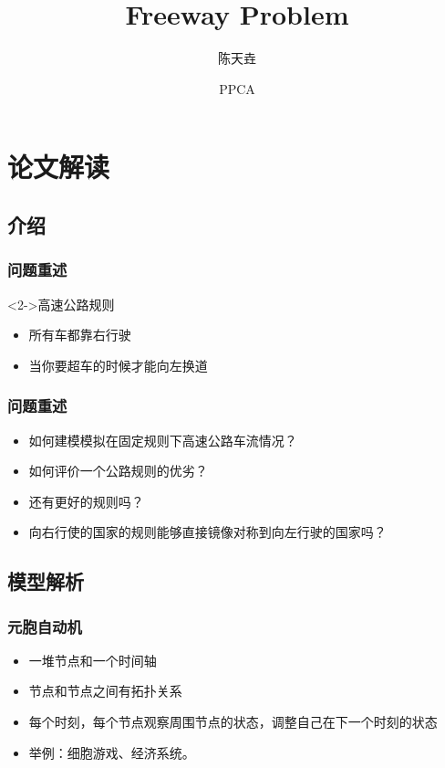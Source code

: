 \documentclass{beamer}
\begin{document}
	\begin{frame}[containsverbatim]
		\title{Freeway Problem}
		\author{陈天垚}
		\date{PPCA}
		\titlepage
	\end{frame}
	
	\section{论文解读}
	
	\subsection{介绍}
	
	\begin{frame}
		\frametitle{问题重述}
		\begin{block}<2->{高速公路规则}
			\begin{itemize}
				\item<3-> 所有车都靠右行驶
				\item<4-> 当你要超车的时候才能向左换道
			\end{itemize}
		\end{block}
	\end{frame}
	
	\begin{frame}
		\frametitle{问题重述}
		\begin{block}{}
			\begin{itemize}
				\item<2-> 如何建模模拟在固定规则下高速公路车流情况？
				\item<3-> 如何评价一个公路规则的优劣？
				\item<4-> 还有更好的规则吗？
				\item<5-> 向右行使的国家的规则能够直接镜像对称到向左行驶的国家吗？
			\end{itemize}
		\end{block}
	\end{frame}
	
	\subsection{模型解析}
	
	\begin{frame}
		\frametitle{元胞自动机}
		\begin{block}{}
			\begin{itemize}
				\item<2-> 一堆节点和一个时间轴
				\item<3-> 节点和节点之间有拓扑关系
				\item<4-> 每个时刻，每个节点观察周围节点的状态，调整自己在下一个时刻的状态
				\item<5-> 举例：细胞游戏、经济系统。
			\end{itemize}
		\end{block}
	\end{frame}
	
\end{document}
